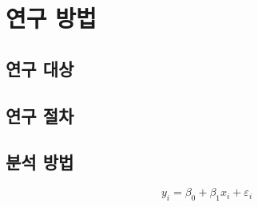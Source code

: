\chapter{연구 방법}
\label{ch:methodology}

\section{연구 대상}

\section{연구 절차}

\section{분석 방법}

\begin{equation}
  y_i = \beta_0 + \beta_1 x_i + \varepsilon_i
  \label{eq:example}
\end{equation}
